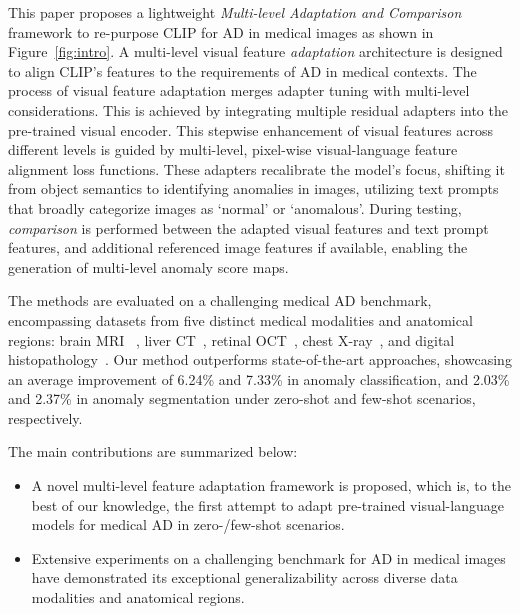 This paper proposes a lightweight \textit{Multi-level Adaptation and Comparison} framework to re-purpose CLIP for AD in medical images as shown in Figure~\ref{fig:intro}. A multi-level visual feature \textit{adaptation} architecture is designed to align CLIP's features to the requirements of AD in medical contexts. The process of visual feature adaptation merges adapter tuning with multi-level considerations. This is achieved by integrating multiple residual adapters into the pre-trained visual encoder. This stepwise enhancement of visual features across different levels is guided by multi-level, pixel-wise visual-language feature alignment loss functions. These adapters recalibrate the model's focus, shifting it from object semantics to identifying anomalies in images, utilizing text prompts that broadly categorize images as `normal' or `anomalous'. During testing, \textit{comparison} is performed between the adapted visual features and text prompt features, and additional referenced image features if available, enabling the generation of multi-level anomaly score maps. 

The methods are evaluated on a challenging medical AD benchmark, encompassing datasets from five distinct medical modalities and anatomical regions: brain MRI ~\cite{baid2021rsna,bakas2017advancing,menze2014multimodal}, liver CT~\cite{landman2015miccai,bilic2023liver}, retinal OCT~\cite{hu2019automated,kermany2018identifying}, chest X-ray~\cite{wang2017chestx}, and digital histopathology~\cite{bejnordi2017diagnostic}. Our method outperforms state-of-the-art approaches, showcasing an average improvement of 6.24\% and 7.33\% in anomaly classification, and 2.03\% and 2.37\% in anomaly segmentation under zero-shot and few-shot scenarios, respectively. 

The main contributions are summarized below:
\begin{itemize}
    \item 
    A novel multi-level feature adaptation framework is proposed, which is, to the best of our knowledge, the first attempt to adapt pre-trained visual-language models for medical AD in zero-/few-shot scenarios. 
    \item Extensive experiments on a challenging benchmark for AD in medical images have demonstrated its exceptional generalizability across diverse data modalities and anatomical regions.
\end{itemize}